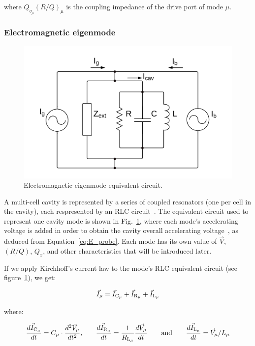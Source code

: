 \documentclass[a4paper,12pt]{article}
\begin{document}
\noindent where $Q_{g_{\mu}}(R/Q)_\mu$ is the coupling impedance of the drive port of mode $\mu$.

\subsubsection{Electromagnetic eigenmode}

\begin{figure}
\centering
\includegraphics[scale=0.20]{../figures/cavity_eq_circuit.png}
\caption{Electromagnetic eigenmode equivalent circuit.}
\label{fig:cav_eq_circuit}
\end{figure}

A multi-cell cavity is represented by a series of coupled resonators (one per cell in the cavity), each respresented by an RLC circuit~\cite{ref:montgomery}. The equivalent circuit used to represent one cavity mode is shown in Fig.~\ref{fig:cav_eq_circuit}, where each mode's accelerating voltage is added in order to obtain the cavity overall accelerating voltage~\cite{ref:cell_modes}, as deduced from Equation~\ref{eq:E_probe}. Each mode has its own value of $\vec V$, $(R/Q)$, $Q_x$, and other characteristics that will be introduced later.

If we apply Kirchhoff's current law to the mode's RLC equivalent circuit (see figure~\ref{fig:cav_eq_circuit}), we get:

\begin{equation}
  \centering \vec I_{\mu} = \vec I_{\rm C_{\mu}} + \vec I_{\rm R_{\mu}} + \vec I_{\rm L_{\mu}}
  \label{eq:currents}
\end{equation}

\noindent where:

\begin{equation}
  \frac{d\vec I_{\rm C_{\mu}}}{dt} = C_{\mu} \cdot \frac{d^2\vec V_{\mu}}{dt^2}\text{,}\qquad \frac{d\vec I_{\rm R_{\mu}}}{dt} = \frac{1}{R_{\rm L_{\mu}}}\frac{d\vec V_{\mu}}{dt} \qquad \text{and}\qquad \frac{d\vec I_{\rm L_{\mu}}}{dt} = \vec V_{\mu}/L_{\mu}
  \label{eq:currents2}
\end{equation}
\end{document}
